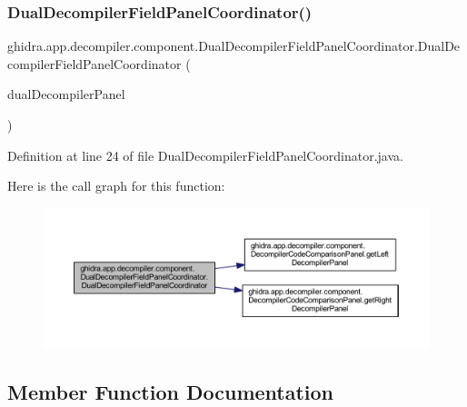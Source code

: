 \subsubsection{\texorpdfstring{DualDecompilerFieldPanelCoordinator()}{DualDecompilerFieldPanelCoordinator()}}
{\footnotesize\ttfamily ghidra.\+app.\+decompiler.\+component.\+Dual\+Decompiler\+Field\+Panel\+Coordinator.\+Dual\+Decompiler\+Field\+Panel\+Coordinator (\begin{DoxyParamCaption}\item[{\mbox{\hyperlink{classghidra_1_1app_1_1decompiler_1_1component_1_1_decompiler_code_comparison_panel}{Decompiler\+Code\+Comparison\+Panel}}$<$? extends \mbox{\hyperlink{classghidra_1_1app_1_1decompiler_1_1component_1_1_dual_decompiler_field_panel_coordinator}{Dual\+Decompiler\+Field\+Panel\+Coordinator}} $>$}]{dual\+Decompiler\+Panel }\end{DoxyParamCaption})\hspace{0.3cm}{\ttfamily [inline]}}



Definition at line 24 of file Dual\+Decompiler\+Field\+Panel\+Coordinator.\+java.

Here is the call graph for this function\+:
\nopagebreak
\begin{figure}[H]
\begin{center}
\leavevmode
\includegraphics[width=350pt]{classghidra_1_1app_1_1decompiler_1_1component_1_1_dual_decompiler_field_panel_coordinator_a37bc7004003f2f9661dc19a7412149e7_cgraph}
\end{center}
\end{figure}


\subsection{Member Function Documentation}
\mbox{\label{classghidra_1_1app_1_1decompiler_1_1component_1_1_dual_decompiler_field_panel_coordinator_a9bab738b2c867a3a99540a68d9737c4a}} 
